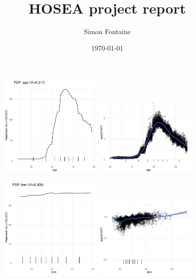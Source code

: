 \documentclass[12pt]{article}
\title{HOSEA project report}
\author{Simon Fontaine}
\date{\today}
\begin{document}


\begin{figure}[h]
\centering
\includegraphics[width=0.45\textwidth]{figures/pdp_new/age.pdf}
\includegraphics[width=0.45\textwidth]{figures/shap_new/age.pdf}
\end{figure}
\begin{figure}[h]
\centering
\includegraphics[width=0.45\textwidth]{figures/pdp_new/bmi.pdf}
\includegraphics[width=0.45\textwidth]{figures/shap_new/bmi.pdf}
\end{figure}
\end{document}
